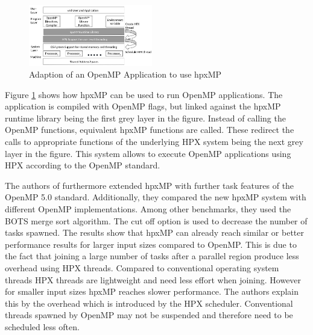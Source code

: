  \begin{figure}[htbp]
	\centering
	\includegraphics[width=0.48\textwidth]{figures/hpxMP.JPG}
	\caption{Adaption of an OpenMP Application to use hpxMP~\cite{hpxMP.2019}}
	\label{fig:hpxMP}
  \end{figure}
  
  Figure \ref{fig:hpxMP} shows how hpxMP can be used to run OpenMP applications.
  The application is compiled with OpenMP flags, but linked against the hpxMP runtime library being the first grey layer in the figure.
  Instead of calling the OpenMP functions, equivalent hpxMP functions are called.
  These redirect the calls to appropriate functions of the underlying HPX system being the next grey layer in the figure.
  This system allows to execute OpenMP applications using HPX according to the OpenMP standard.
  
  The authors of \cite{Zhang.2192020} furthermore extended hpxMP with further task features of the OpenMP 5.0 standard.
  Additionally, they compared the new hpxMP system with different OpenMP implementations.
  Among other benchmarks, they used the BOTS merge sort algorithm.
  The cut off option is used to decrease the number of tasks spawned.
  The results show that hpxMP can already reach similar or better performance results for larger input sizes compared to OpenMP.
  This is due to the fact that joining a large number of tasks after a parallel region produce less overhead using HPX threads.
  Compared to conventional operating system threads HPX threads are lightweight and need less effort when joining.
  However for smaller input sizes hpxMP reaches slower performance.
  The authors explain this by the overhead which is introduced by the HPX scheduler.
  Conventional threads spawned by OpenMP may not be suspended and therefore need to be scheduled less often.
  